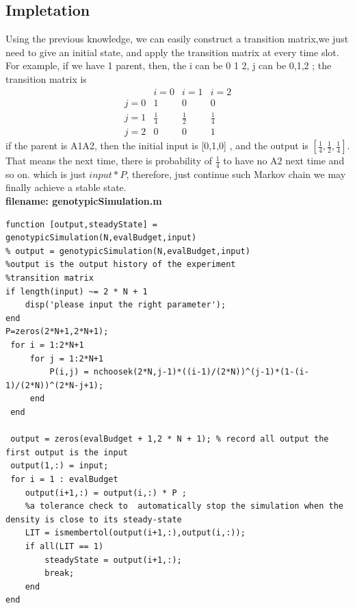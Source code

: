 \documentclass[twoside]{article}
\begin{document}
\subsection{\normalsize{Impletation}}
Using the previous knowledge, we can easily construct a transition matrix,we just need to give an initial state, and apply the transition matrix at every time slot. For example, if we have 1 parent, then, the i can be 0 1 2, j can be 0,1,2 ; the transition matrix is 
\[
\begin{matrix}
 & i=0 & i =1 & i = 2\\
 j = 0 & 1 & 0  & 0 \\
 j = 1 & \frac{1}{4} & \frac{1}{2} & \frac{1}{4} \\
 j = 2 & 0& 0 & 1
\end{matrix}
\]
if the parent is A1A2, then the initial input is [0,1,0] , and the output is $[\frac{1}{4},\frac{1}{2},\frac{1}{4}]$. That means the next time, there is probability of $\frac{1}{4}$ to have no A2 next time and so on. which is just $input * P$, therefore, just continue such Markov chain we may finally achieve a stable state.\\
\noindent \textbf {filename: genotypicSimulation.m}
\begin{lstlisting}
function [output,steadyState] = genotypicSimulation(N,evalBudget,input)
% output = genotypicSimulation(N,evalBudget,input)
%output is the output history of the experiment
%transition matrix 
if length(input) ~= 2 * N + 1
    disp('please input the right parameter');
end
P=zeros(2*N+1,2*N+1); 
 for i = 1:2*N+1
     for j = 1:2*N+1
         P(i,j) = nchoosek(2*N,j-1)*((i-1)/(2*N))^(j-1)*(1-(i-1)/(2*N))^(2*N-j+1);
     end 
 end
 
 output = zeros(evalBudget + 1,2 * N + 1); % record all output the first output is the input
 output(1,:) = input;
 for i = 1 : evalBudget
    output(i+1,:) = output(i,:) * P ;
    %a tolerance check to  automatically stop the simulation when the density is close to its steady-state
    LIT = ismembertol(output(i+1,:),output(i,:));
    if all(LIT == 1)  
        steadyState = output(i+1,:);
        break;
    end
end
\end{lstlisting}
\end{document}
